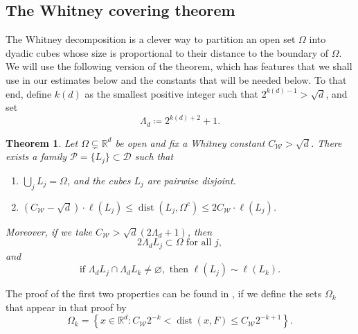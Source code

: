 \documentclass[12pt]{amsart}
\newcommand{\R}{\mathbb{R}}
\newcommand{\dist}[1]{\operatorname{dist}\left(#1\right) }
\newcommand{\D}{\mathscr{D}}
\theoremstyle{plain}
\newtheorem{theorem}{Theorem}[section] %
\theoremstyle{definition} %
\numberwithin{equation}{section}
\begin{document}
\subsection{The Whitney covering theorem} The Whitney decomposition is a clever way to partition an open set $\Omega$ into dyadic cubes whose size is proportional to their distance to the boundary of $\Omega$. We will use the following version of the theorem, which has features that we shall use in our estimates below and the constants that will be needed below. To that end, define $k(d)$ as the smallest positive integer such that $2^{k(d)-1}> \sqrt{d}$, and set
\begin{equation*}%
    \Lambda_d \coloneqq 2^{k(d)+2}+1.    
\end{equation*}

\begin{theorem}\label{Whitney}
Let $\Omega\subsetneq\R^d$ be open and fix a Whitney constant $C_{\mathcal{W}}>\sqrt{d}$. There exists a family $\mathcal{P}=\{L_j\} \subset \D$ such that
    \begin{enumerate}
        \item $\bigcup_{j}L_j=\Omega$, and the cubes $L_j$ are pairwise disjoint.
        \item $(C_{\mathcal{W}}-\sqrt{d})\cdot\ell(L_j)\leq \dist{L_j,\Omega^c}\leq 2C_{\mathcal{W}}\cdot \ell(L_j)$.
    \end{enumerate}
Moreover, if we take $C_{\mathcal{W}}>\sqrt{d}(2\Lambda_d+1)$, then
    \[
    2\Lambda_dL_j\subset \Omega  \text{ for all } j,
    \]
    and
    \[
    \text{if }\Lambda_dL_j\cap \Lambda_dL_k\neq\varnothing, \text{ then }\ell(L_j)\sim \ell(L_k).
    \]
\end{theorem}
The proof of the first two properties can be found in \cite[Ch. IV, Th. 1]{steinSingularIntegrals}, if we define the sets $\Omega_k$ that appear in that proof by 
$$
\Omega_{k}=\left\{x\in \R^d: C_{\mathcal{W}}2^{-k}<\dist{x,F}\leq C_{\mathcal{W}}2^{-k+1}\right\}.
$$
\end{document}
